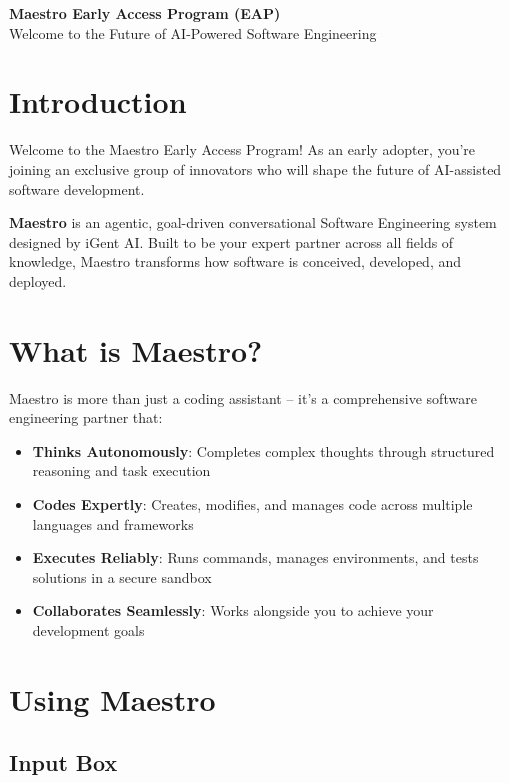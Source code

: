 \documentclass[11pt,letterpaper]{article}
\begin{document}
\begin{center}
    {\Huge\bfseries\color{maestroBlue} Maestro Early Access Program (EAP)}\\[0.5cm]
    {\Large\color{darkGray} Welcome to the Future of AI-Powered Software Engineering}\\[1cm]
\end{center}

\section*{\color{maestroBlue}Introduction}

Welcome to the Maestro Early Access Program! As an early adopter, you're joining an exclusive group of innovators who will shape the future of AI-assisted software development.

\textbf{Maestro} is an agentic, goal-driven conversational Software Engineering system designed by iGent AI. Built to be your expert partner across all fields of knowledge, Maestro transforms how software is conceived, developed, and deployed.

\section*{\color{maestroBlue}What is Maestro?}

Maestro is more than just a coding assistant – it's a comprehensive software engineering partner that:

\begin{itemize}
    \item \textbf{Thinks Autonomously}: Completes complex thoughts through structured reasoning and task execution
    \item \textbf{Codes Expertly}: Creates, modifies, and manages code across multiple languages and frameworks
    \item \textbf{Executes Reliably}: Runs commands, manages environments, and tests solutions in a secure sandbox
    \item \textbf{Collaborates Seamlessly}: Works alongside you to achieve your development goals
\end{itemize}

\section*{\color{maestroBlue}Using Maestro}

\subsection*{Input Box}
\end{document}
